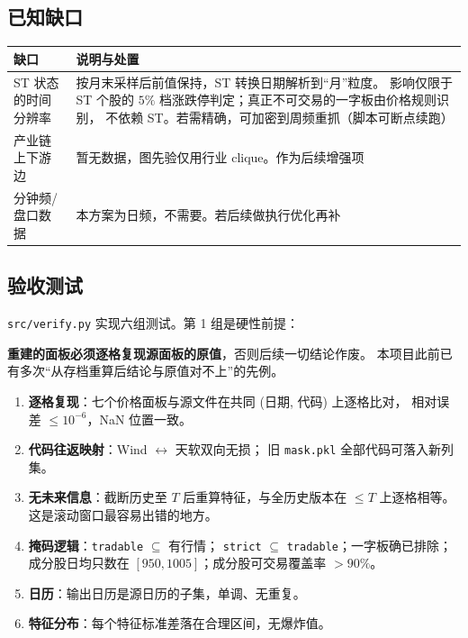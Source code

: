 \documentclass[11pt, a4paper]{ctexart}
\newcommand{\file}[1]{\texttt{\small #1}}
\begin{document}
\subsection{已知缺口}

\begin{table}[h]
\centering
\small
\begin{tabular}{lp{9.5cm}}
\toprule
缺口 & 说明与处置 \\
\midrule
ST 状态的时间分辨率 & 按月末采样后前值保持，ST 转换日期解析到“月”粒度。
  影响仅限于 ST 个股的 $5\%$ 档涨跌停判定；真正不可交易的一字板由价格规则识别，
  不依赖 ST。若需精确，可加密到周频重抓（脚本可断点续跑） \\
产业链上下游边 & 暂无数据，图先验仅用行业 clique。作为后续增强项 \\
分钟频/盘口数据 & 本方案为日频，不需要。若后续做执行优化再补 \\
\bottomrule
\end{tabular}
\end{table}

\subsection{验收测试}

\file{src/verify.py} 实现六组测试。第 1 组是硬性前提：

\begin{warnbox}
\textbf{重建的面板必须逐格复现源面板的原值}，否则后续一切结论作废。
本项目此前已有多次“从存档重算后结论与原值对不上”的先例。
\end{warnbox}

\begin{enumerate}
  \item \textbf{逐格复现}：七个价格面板与源文件在共同 (日期, 代码) 上逐格比对，
        相对误差 $\le 10^{-6}$，NaN 位置一致。
  \item \textbf{代码往返映射}：Wind $\leftrightarrow$ 天软双向无损；
        旧 \file{mask.pkl} 全部代码可落入新列集。
  \item \textbf{无未来信息}：截断历史至 $T$ 后重算特征，与全历史版本在 $\le T$ 上逐格相等。
        这是滚动窗口最容易出错的地方。
  \item \textbf{掩码逻辑}：\file{tradable} $\subseteq$ 有行情；
        \file{strict} $\subseteq$ \file{tradable}；一字板确已排除；
        成分股日均只数在 $[950, 1005]$；成分股可交易覆盖率 $> 90\%$。
  \item \textbf{日历}：输出日历是源日历的子集，单调、无重复。
  \item \textbf{特征分布}：每个特征标准差落在合理区间，无爆炸值。
\end{enumerate}
\end{document}
